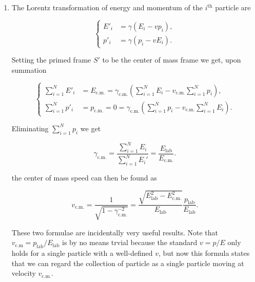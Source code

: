 \documentclass[english,a4paper,12pt]{report}
\begin{document}
{\begin{enumerate}
    \item The Lorentz transformation of energy and momentum of the \(i^{\text{th}} \) particle are 
    
    \begin{equation}
        \begin{cases}
            E'_{i}  &= \gamma (E_{i} -vp_{i} ),\\
            p'_{i}  &= \gamma (p_{i} -vE_{i} ).
        \end{cases}
    \end{equation}
    
    Setting the primed frame \(S'\) to be the center of mass frame we get, upon summation

    \begin{equation}
        \begin{cases}
            \sum_{i=1}^{N} E'_{i}  &= E_{\text{c.m.} } = \gamma _{\text{c.m.} } \left(\sum_{i=1}^{N} E_{i} - v_{\text{c.m.} } \sum_{i=1}^{N} p_{i} \right),\\
            \sum_{i=1}^{N} p'_{i}  &= p_{\text{c.m.} } = 0 = \gamma _{\text{c.m.} } \left( \sum_{i=1}^{N} p_{i} - v_{\text{c.m.} } \sum_{i=1}^{N} E_{i}   \right).
        \end{cases}
    \end{equation}
    
    Eliminating \(\sum_{i=1}^{N} p_{i} \) we get 
    
    \begin{equation}
        \gamma _{\text{c.m.} } = \frac{\sum_{i=1}^{N} E_{i} }{\sum_{i=1}^{N} E_{i}' } = \frac{E_{\text{lab} } }{E_{\text{c.m.} } }.
    \end{equation}
    
    the center of mass speed can then be found as

    \begin{equation}
       v _{\text{c.m.} }  = \frac{1}{\sqrt{1-\gamma _{\text{c.m.} } ^{-2} } } =  \frac{\sqrt{E_{\text{lab} }^2-E_{\text{c.m.} }^2  }}{E_{\text{lab} } } \frac{p_{\text{lab} } }{E_{\text{lab} } }.
    \end{equation}
    
    These two formulae are incidentally very useful results. Note that \(v_{\text{c.m} } = p _{\text{lab} } /E_{\text{lab} }   \) is by no means trvial because the standard \(v = p/E\) only holds for a single particle with a well-defined \(v\), but now this formula states that we can regard the collection of particle as a single particle moving at velocity \(v_{\text{c.m.} }\).  


\end{enumerate}}
\end{document}
